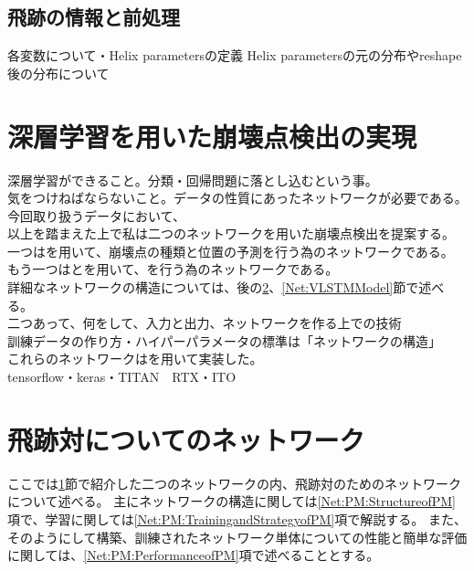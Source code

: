 \subsection{飛跡の情報と前処理} \label{Net:Data:TrackInformationandPreprocessing}

各変数について・Helix parametersの定義\cite{TrackParametersLCIO}
Helix parametersの元の分布やreshape後の分布について\\

\section{深層学習を用いた崩壊点検出の実現} \label{Net:forVertexFinderwithDL}

深層学習ができること。分類・回帰問題に落とし込むという事。\\
気をつけねばならないこと。データの性質にあったネットワークが必要である。今回取り扱うデータにおいて、\\

以上を踏まえた上で私は二つのネットワークを用いた崩壊点検出を提案する。\\
一つはを用いて、崩壊点の種類と位置の予測を行う為のネットワークである。\\
もう一つはとを用いて、を行う為のネットワークである。\\
詳細なネットワークの構造については、後の\ref{Net:PairModel}、\ref{Net:VLSTMModel}節で述べる。\\
二つあって、何をして、入力と出力、ネットワークを作る上での技術\\
訓練データの作り方・ハイパーパラメータの標準は「ネットワークの構造」\\

これらのネットワークはを用いて実装した。\\
tensorflow・keras・TITAN　RTX・ITO\\


\section{飛跡対についてのネットワーク} \label{Net:PairModel}

ここでは\ref{Net:forVertexFinderwithDL}節で紹介した二つのネットワークの内、飛跡対のためのネットワークについて述べる。
主にネットワークの構造に関しては\ref{Net:PM:StructureofPM}項で、学習に関しては\ref{Net:PM:TrainingandStrategyofPM}項で解説する。
また、そのようにして構築、訓練されたネットワーク単体についての性能と簡単な評価に関しては、\ref{Net:PM:PerformanceofPM}項で述べることとする。

